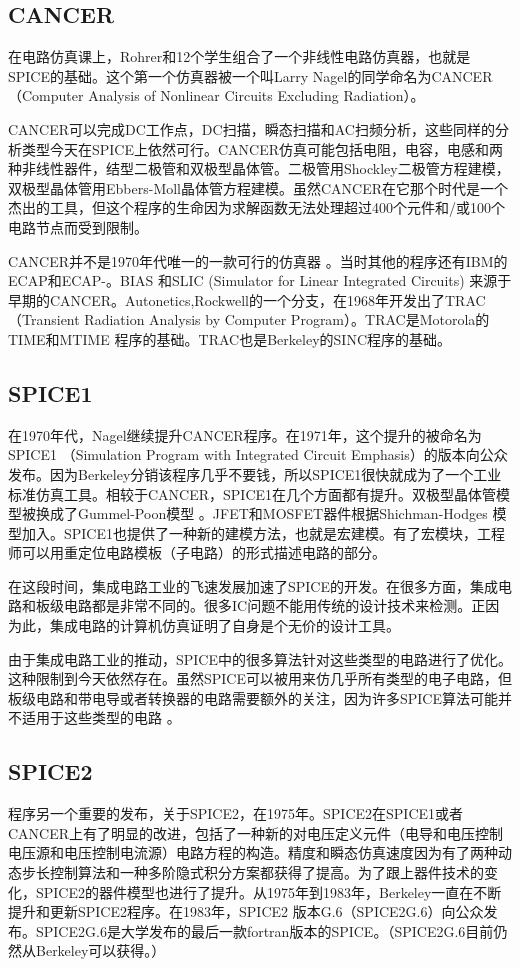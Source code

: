 \subsection{CANCER}
在电路仿真课上，Rohrer和12个学生组合了一个非线性电路仿真器，也就是SPICE的基础。这个第一个仿真器被一个叫Larry Nagel的同学命名为CANCER \cite{1050166} （Computer Analysis of Nonlinear Circuits Excluding Radiation）。

CANCER可以完成DC工作点，DC扫描，瞬态扫描和AC扫频分析，这些同样的分析类型今天在SPICE上依然可行。CANCER仿真可能包括电阻，电容，电感和两种非线性器件，结型二极管和双极型晶体管。二极管用Shockley二极管方程建模，双极型晶体管用Ebbers-Moll晶体管方程建模。虽然CANCER在它那个时代是一个杰出的工具，但这个程序的生命因为求解函数无法处理超过400个元件和/或100个电路节点而受到限制。

CANCER并不是1970年代唯一的一款可行的仿真器 \cite{171136}。当时其他的程序还有IBM的ECAP和ECAP-\uppercase\expandafter{}。BIAS \cite{1050153}和SLIC \cite{1050168} (Simulator for Linear Integrated Circuits) 来源于早期的CANCER。Autonetics,Rockwell的一个分支，在1968年开发出了TRAC \cite{TRAC} （Transient Radiation Analysis by Computer Program）。TRAC是Motorola的TIME和MTIME \cite{SPICE2}程序的基础。TRAC也是Berkeley的SINC程序的基础。
\subsection{SPICE1}
在1970年代，Nagel继续提升CANCER程序。在1971年，这个提升的被命名为SPICE1 （Simulation Program with Integrated Circuit Emphasis）的版本向公众发布。因为Berkeley分销该程序几乎不要钱，所以SPICE1很快就成为了一个工业标准仿真工具。相较于CANCER，SPICE1在几个方面都有提升。双极型晶体管模型被换成了Gummel-Poon模型 \cite{Gummel}。JFET和MOSFET器件根据Shichman-Hodges \cite{1049902}模型加入。SPICE1也提供了一种新的建模方法，也就是宏建模。有了宏模块，工程师可以用重定位电路模板（子电路）的形式描述电路的部分。

在这段时间，集成电路工业的飞速发展加速了SPICE的开发。在很多方面，集成电路和板级电路都是非常不同的。很多IC问题不能用传统的设计技术来检测。正因为此，集成电路的计算机仿真证明了自身是个无价的设计工具。

由于集成电路工业的推动，SPICE中的很多算法针对这些类型的电路进行了优化。这种限制到今天依然存在。虽然SPICE可以被用来仿几乎所有类型的电子电路，但板级电路和带电导或者转换器的电路需要额外的关注，因为许多SPICE算法可能并不适用于这些类型的电路 \cite{Memo}。

\subsection{SPICE2}
程序另一个重要的发布，关于SPICE2，在1975年。SPICE2在SPICE1或者CANCER上有了明显的改进，包括了一种新的对电压定义元件（电导和电压控制电压源和电压控制电流源）电路方程的构造。精度和瞬态仿真速度因为有了两种动态步长控制算法和一种多阶隐式积分方案都获得了提高。为了跟上器件技术的变化，SPICE2的器件模型也进行了提升。从1975年到1983年，Berkeley一直在不断提升和更新SPICE2程序。在1983年，SPICE2 版本G.6（SPICE2G.6）向公众发布。SPICE2G.6是大学发布的最后一款fortran版本的SPICE。（SPICE2G.6目前仍然从Berkeley可以获得。）

